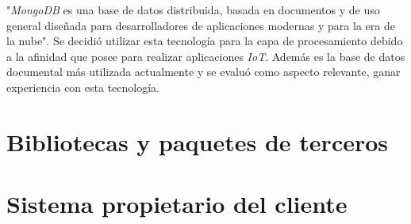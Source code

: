 "\emph{MongoDB} es una base de datos distribuida, basada en documentos y de uso general diseñada para desarrolladores de aplicaciones modernas y para la era de la nube". \citep{WEBSITE:MongoHome}
Se decidió utilizar esta tecnología para la capa de procesamiento debido a la afinidad que posee para realizar aplicaciones \emph{IoT}.
Además es la base de datos documental más utilizada actualmente \citep{WEBSITE:DBRanking} y se evaluó como aspecto relevante, ganar experiencia con esta tecnología.

	
\section{Bibliotecas y paquetes de terceros}










\section{Sistema propietario del cliente}